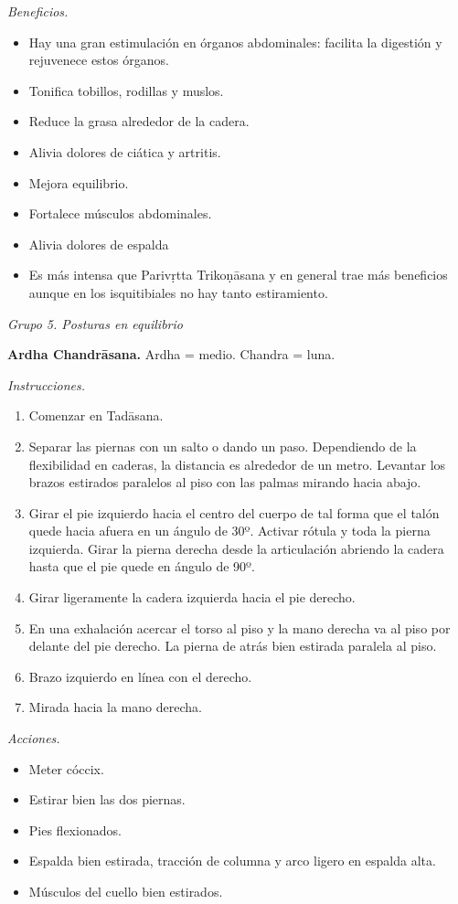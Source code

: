 \emph{Beneficios.}
\begin{itemize}
\item Hay una gran estimulación en órganos
abdominales: facilita la digestión y
rejuvenece estos órganos.
\item Tonifica tobillos, rodillas y muslos.
\item Reduce la grasa alrededor de la cadera.
\item Alivia dolores de ciática y artritis.
\item Mejora equilibrio.
\item Fortalece músculos abdominales.
\item Alivia dolores de espalda
\item Es más intensa que Parivṛtta
Trikoṇāsana y en general trae más beneficios
aunque en los isquitibiales no hay tanto
estiramiento.
\end{itemize}

\medskip\noindent\emph{Grupo 5. Posturas en
equilibrio}

\medskip\noindent\textbf{Ardha Chandrāsana.}
Ardha = medio. Chandra = luna.

\emph{Instrucciones.}
\begin{enumerate}
\item Comenzar en Tadāsana.
\item Separar las piernas con un salto o
dando un paso. Dependiendo de la flexibilidad
en caderas, la distancia es alrededor de un
metro. Levantar los brazos estirados
paralelos al piso con las palmas mirando
hacia abajo.
\item Girar el pie izquierdo hacia el centro
del cuerpo de tal forma que el talón quede
hacia afuera en un ángulo de 30º. Activar
rótula y toda la pierna izquierda. Girar la
pierna derecha desde la articulación abriendo
la cadera hasta que el pie quede en ángulo de
90º.
\item Girar ligeramente la
cadera izquierda hacia el pie derecho.
\item En una exhalación acercar el torso al
piso y la mano derecha va al piso por delante
del pie derecho. La pierna de atrás bien
estirada paralela al piso.
\item Brazo izquierdo en línea con el
derecho.
\item Mirada hacia la mano derecha.
\end{enumerate}

\emph{Acciones.}
\begin{itemize}
\item Meter cóccix.
\item Estirar bien las dos piernas.
\item Pies flexionados.
\item Espalda bien estirada, tracción de
columna y arco ligero en espalda alta.
\item Músculos del cuello bien estirados.
\end{itemize}

